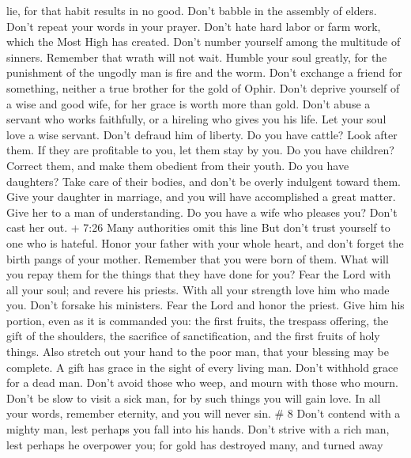 lie, for that habit results in no good.  Don't babble in
the assembly of elders. Don't repeat your words in your prayer.
 Don't hate hard labor or farm work, which the Most High
has created.  Don't number yourself among the multitude of
sinners. Remember that wrath will not wait.  Humble your
soul greatly, for the punishment of the ungodly man is fire and the
worm.  Don't exchange a friend for something, neither a
true brother for the gold of Ophir.  Don't deprive yourself
of a wise and good wife, for her grace is worth more than gold.
 Don't abuse a servant who works faithfully, or a hireling
who gives you his life.  Let your soul love a wise servant.
Don't defraud him of liberty.  Do you have cattle? Look
after them. If they are profitable to you, let them stay by you.
 Do you have children? Correct them, and make them obedient
from their youth.  Do you have daughters? Take care of
their bodies, and don't be overly indulgent toward them. 
Give your daughter in marriage, and you will have accomplished a great
matter. Give her to a man of understanding.  Do you have a
wife who pleases you? Don't cast her out. + 7:26 Many authorities omit
this line But don't trust yourself to one who is hateful. 
Honor your father with your whole heart, and don't forget the birth
pangs of your mother.  Remember that you were born of them.
What will you repay them for the things that they have done for you?
 Fear the Lord with all your soul; and revere his priests.
 With all your strength love him who made you. Don't
forsake his ministers.  Fear the Lord and honor the priest.
Give him his portion, even as it is commanded you: the first fruits, the
trespass offering, the gift of the shoulders, the sacrifice of
sanctification, and the first fruits of holy things.  Also
stretch out your hand to the poor man, that your blessing may be
complete.  A gift has grace in the sight of every living
man. Don't withhold grace for a dead man.  Don't avoid
those who weep, and mourn with those who mourn.  Don't be
slow to visit a sick man, for by such things you will gain love.
 In all your words, remember eternity, and you will never
sin. \# 8  Don't contend with a mighty man, lest perhaps you
fall into his hands.  Don't strive with a rich man, lest
perhaps he overpower you; for gold has destroyed many, and turned away
